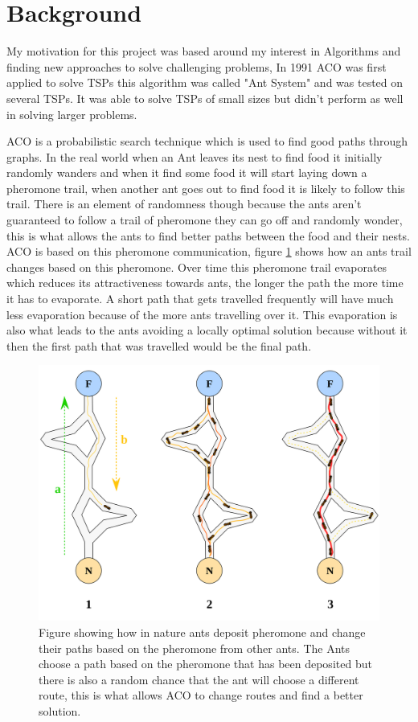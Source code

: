 \section{Background}
My motivation for this project was based around my interest in Algorithms and finding new approaches to solve challenging problems, In 1991 ACO was first applied to solve TSPs\cite{dorigo1991distributed} this algorithm was called "Ant System" and was tested on several TSPs. It was able to solve TSPs of small sizes but didn't perform as well in solving larger problems. 

ACO is a probabilistic search technique which is used to find good paths through graphs. In the real world when an Ant leaves its nest to find food it initially randomly wanders and when it find some food it will start laying down a pheromone trail, when another ant goes out to find food it is likely to follow this trail. There is an element of randomness though because the ants aren't guaranteed to follow a trail of pheromone they can go off and randomly wonder, this is what allows the ants to find better paths between the food and their nests. ACO is based on this pheromone communication, figure \ref{fig:aco_pheremone_example} shows how an ants trail changes based on this pheromone. Over time this pheromone trail evaporates which reduces its attractiveness towards ants, the longer the path the more time it has to evaporate. A short path that gets travelled frequently will have much less evaporation because of the more ants travelling over it. This evaporation is also what leads to the ants avoiding a locally optimal solution because without it then the first path that was travelled would be the final path.

\begin{figure}
    \centering
    \includegraphics[width=\textwidth]{figures/aco_pheremone_demo.png}
    \caption{Figure showing how in nature ants deposit pheromone and change their paths based on the pheromone from other ants. The Ants choose a path based on the pheromone that has been deposited but there is also a random chance that the ant will choose a different route, this is what allows ACO to change routes and find a better solution.}
    \label{fig:aco_pheremone_example}
\end{figure}

